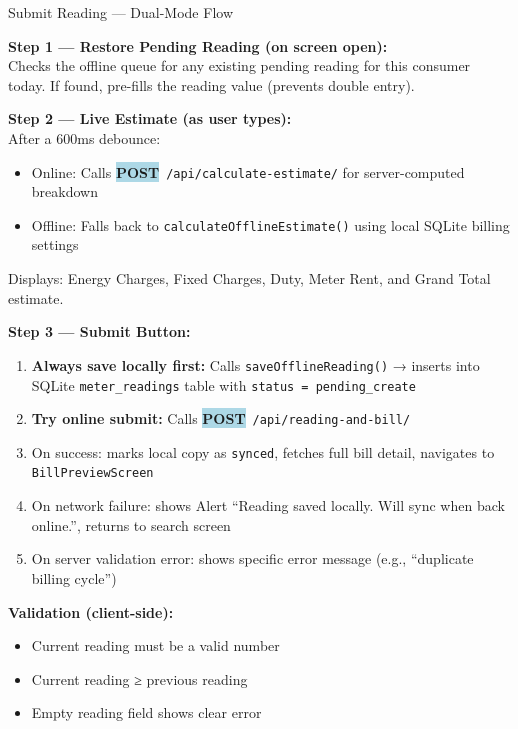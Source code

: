 \documentclass[12pt, a4paper]{report}
\newcommand{\httppost}{\colorbox{lightBlue}{\textcolor{deepBlue}{\textbf{\small POST}}}}
\newenvironment{featurelist}{%
    \begin{itemize}[leftmargin=1.5em, itemsep=2pt, parsep=0pt]
}{%
    \end{itemize}
}
\begin{document}
\begin{actorbox}{Submit Reading — Dual-Mode Flow}

\textbf{Step 1 — Restore Pending Reading (on screen open):}\\
Checks the offline queue for any existing pending reading for this consumer today. If found, pre-fills the reading value (prevents double entry).

\vspace{0.5em}
\textbf{Step 2 — Live Estimate (as user types):}\\
After a 600ms debounce:
\begin{itemize}
    \item Online: Calls \httppost\ \texttt{/api/calculate-estimate/} for server-computed breakdown
    \item Offline: Falls back to \texttt{calculateOfflineEstimate()} using local SQLite billing settings
\end{itemize}
Displays: Energy Charges, Fixed Charges, Duty, Meter Rent, and Grand Total estimate.

\vspace{0.5em}
\textbf{Step 3 — Submit Button:}
\begin{enumerate}
    \item \textbf{Always save locally first:} Calls \texttt{saveOfflineReading()} → inserts into SQLite \texttt{meter\_readings} table with \texttt{status = pending\_create}
    \item \textbf{Try online submit:} Calls \httppost\ \texttt{/api/reading-and-bill/}
    \item On success: marks local copy as \texttt{synced}, fetches full bill detail, navigates to \texttt{BillPreviewScreen}
    \item On network failure: shows Alert ``Reading saved locally. Will sync when back online.'', returns to search screen
    \item On server validation error: shows specific error message (e.g., ``duplicate billing cycle'')
\end{enumerate}
\end{actorbox}

\textbf{Validation (client-side):}
\begin{featurelist}
    \item Current reading must be a valid number
    \item Current reading ≥ previous reading
    \item Empty reading field shows clear error
\end{featurelist}
\end{document}
